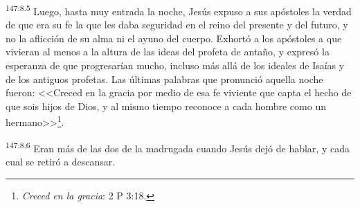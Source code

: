 \par 
\textsuperscript{147:8.5} Luego, hasta muy entrada la noche, Jesús expuso a sus apóstoles la verdad de que era su fe la que les daba seguridad en el reino del presente y del futuro, y no la aflicción de su alma ni el ayuno del cuerpo. Exhortó a los apóstoles a que vivieran al menos a la altura de las ideas del profeta de antaño, y expresó la esperanza de que progresarían mucho, incluso más allá de los ideales de Isaías y de los antiguos profetas. Las últimas palabras que pronunció aquella noche fueron: <<Creced en la gracia por medio de esa fe viviente que capta el hecho de que sois hijos de Dios, y al mismo tiempo reconoce a cada hombre como un hermano>>\footnote{\textit{Creced en la gracia}: 2 P 3:18.}.

\par 
\textsuperscript{147:8.6} Eran más de las dos de la madrugada cuando Jesús dejó de hablar, y cada cual se retiró a descansar.